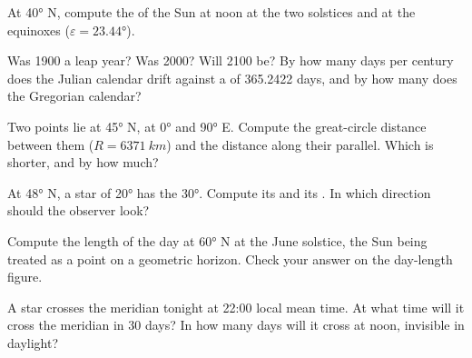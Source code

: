 \begin{exercise}[$\star$]\label{exo:b1:spherical-astronomy:3}
At  \ang{40} N, compute the  of the Sun at noon at the two
solstices and at the equinoxes ($\varepsilon = \ang{23.44}$).
\end{exercise}

\begin{exercise}[$\star$]\label{exo:b1:spherical-astronomy:4}
Was 1900 a leap year? Was 2000? Will 2100 be? By how many days per century
does the Julian calendar drift against a  of 365.2422 days, and
by how many does the Gregorian calendar?
\end{exercise}

\begin{exercise}[$\star\star$]\label{exo:b1:spherical-astronomy:5}
Two points lie at  \ang{45} N, at  \ang{0} and
\ang{90} E. Compute the great-circle distance between them
($R = \qty{6371}{km}$) and the distance along their parallel. Which is
shorter, and by how much?
\end{exercise}

\begin{exercise}[$\star\star$]\label{exo:b1:spherical-astronomy:6}
At  \ang{48} N, a star of  \ang{20} has the 
\ang{30}. Compute its  and its . In which direction should the
observer look?
\end{exercise}

\begin{exercise}[$\star\star$]\label{exo:b1:spherical-astronomy:7}
Compute the length of the day at  \ang{60} N at the June solstice,
the Sun being treated as a point on a geometric horizon. Check your answer on
the day-length figure.
\end{exercise}

\begin{exercise}[$\star\star$]\label{exo:b1:spherical-astronomy:8}
A star crosses the meridian tonight at 22:00 local mean time. At what time
will it cross the meridian in 30 days? In how many days will it cross at
noon, invisible in daylight?
\end{exercise}

